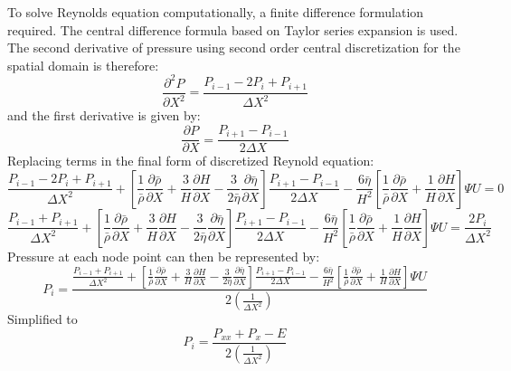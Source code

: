 To solve Reynolds equation computationally, a finite difference formulation required. The central difference formula based on Taylor series expansion \cite{Hoffmann2000} is used. The second derivative of pressure using second order central discretization for the spatial domain is therefore:
\begin{equation}\label{eq3.15}
	\frac{\partial^2 P}{\partial X^2}=\frac{P_{i-1}-2 P_i+P_{i+1}}{\Delta X^2}
\end{equation}
and the first derivative is given by:
\begin{equation}\label{eq3.16}
	\frac{\partial P}{\partial X}=\frac{P_{i+1}-P_{i-1}}{2 \Delta X}
\end{equation}
Replacing terms in the final form of discretized Reynold equation:
\begin{equation}\label{eq3.17}
	\frac{P_{i-1}-2 P_i+P_{i+1}}{\Delta X^2}+\left[\frac{1}{\bar{\rho}} \frac{\partial \bar{\rho}}{\partial X}+\frac{3}{H} \frac{\partial H}{\partial X}-\frac{3}{2 \bar{\eta}} \frac{\partial \bar{\eta}}{\partial X}\right] \frac{P_{i+1}-P_{i-1}}{2 \Delta X}-\frac{6 \bar{\eta}}{H^2}\left[\frac{1}{\bar{\rho}} \frac{\partial \bar{\rho}}{\partial X}+\frac{1}{H} \frac{\partial H}{\partial X}\right] \Psi U=0
\end{equation}
\begin{equation}\label{eq3.18}
	\frac{P_{i-1}+P_{i+1}}{\Delta X^2}+\left[\frac{1}{\bar{\rho}} \frac{\partial \bar{\rho}}{\partial X}+\frac{3}{H} \frac{\partial H}{\partial X}-\frac{3}{2 \bar{\eta}} \frac{\partial \bar{\eta}}{\partial X}\right] \frac{P_{i+1}-P_{i-1}}{2 \Delta X}-\frac{6 \bar{\eta}}{H^2}\left[\frac{1}{\bar{\rho}} \frac{\partial \bar{\rho}}{\partial X}+\frac{1}{H} \frac{\partial H}{\partial X}\right] \Psi U=\frac{2 P_i}{\Delta X^2}
\end{equation}
Pressure at each node point can then be represented by:
\begin{equation}\label{eq3.19}
	P_i=\frac{\frac{P_{i-1}+P_{i+1}}{\Delta X^2}+\left[\frac{1}{\bar{\rho}} \frac{\partial \bar{\rho}}{\partial X}+\frac{3}{H} \frac{\partial H}{\partial X}-\frac{3}{2 \bar{\eta}} \frac{\partial \bar{\eta}}{\partial X}\right] \frac{P_{i+1}-P_{i-1}}{2 \Delta X}-\frac{6 \bar{\eta}}{H^2}\left[\frac{1}{\bar{\rho}} \frac{\partial \bar{\rho}}{\partial X}+\frac{1}{H} \frac{\partial H}{\partial X}\right] \Psi U}{2\left(\frac{1}{\Delta X^2}\right)}
\end{equation}
Simplified to 
\begin{equation}\label{eq3.20}
	P_i=\frac{P_{x x}+P_x-E}{2\left(\frac{1}{\Delta X^2}\right)}
\end{equation}
